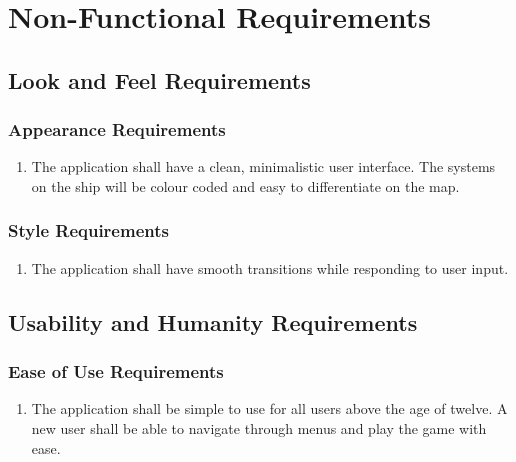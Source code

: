 \documentclass[12pt, titlepage]{article}
\begin{document}
\section{Non-Functional Requirements}
\label{sec:non-functional_requirements}
\subsection{Look and Feel Requirements}
\label{sub:look_and_feel_requirements}

\subsubsection{Appearance Requirements}
\label{ssub:appearance_requirements}
\begin{enumerate}[{LF}1. ]
	\item The application shall have a clean, minimalistic user interface. The systems on the ship will be colour coded and easy to differentiate on the map.
\end{enumerate}

\subsubsection{Style Requirements}
\label{ssub:style_requirements}
\begin{enumerate}[{LF}1. ]
	\item The application shall have smooth transitions while responding to user input. 
\end{enumerate}


\subsection{Usability and Humanity Requirements}
\label{sub:usability_and_humanity_requirements}

\subsubsection{Ease of Use Requirements}
\label{ssub:ease_of_use_requirements}
\begin{enumerate}[{UH}1. ]
	\item The application shall be simple to use for all users above the age of twelve. A new user shall be able to navigate through menus and play the game with ease.
\end{enumerate}
\end{document}
